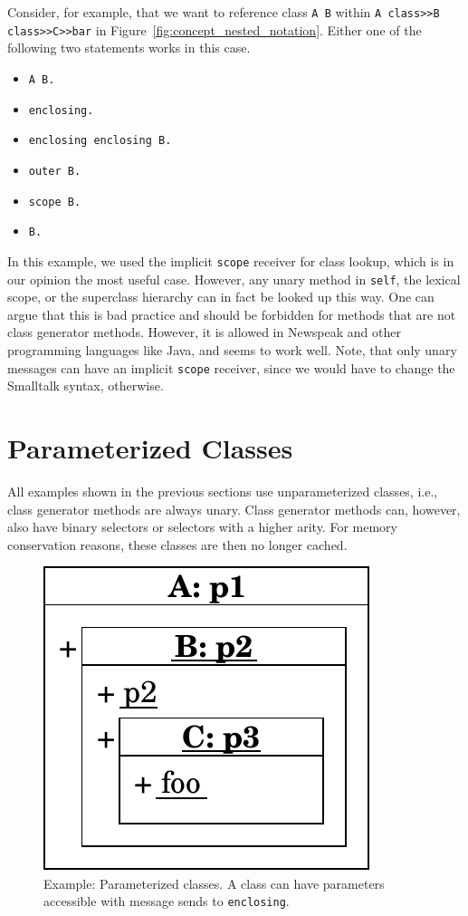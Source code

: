 Consider, for example, that we want to reference class \texttt{A B} within \texttt{A class>>B class>>C>>bar} in Figure~\ref{fig:concept_nested_notation}. Either one of the following two statements works in this case.

\begin{itemize}
	\item \texttt{A B.}
	\item \texttt{enclosing.}
	\item \texttt{enclosing enclosing B.}
	\item \texttt{outer B.}
	\item \texttt{scope B.}
	\item \texttt{B.}
\end{itemize}

In this example, we used the implicit \texttt{scope} receiver for class lookup, which is in our opinion the most useful case. However, any unary method in \texttt{self}, the lexical scope, or the superclass hierarchy can in fact be looked up this way. One can argue that this is bad practice and should be forbidden for methods that are not class generator methods. However, it is allowed in Newspeak and other programming languages like Java, and seems to work well. Note, that only unary messages can have an implicit \texttt{scope} receiver, since we would have to change the Smalltalk syntax, otherwise.

\section{Parameterized Classes}
All examples shown in the previous sections use unparameterized classes, i.e., class generator methods are always unary. Class generator methods can, however, also have binary selectors or selectors with a higher arity. For memory conservation reasons, these classes are then no longer cached.

\begin{figure}
	\includegraphics[scale=0.75]{nested_notation_params.pdf}
	\centering
	\caption[Example: Parameterized classes]{Example: Parameterized classes. A class can have parameters accessible with message sends	 to \texttt{enclosing}.}
	\label{fig:concept_param_classes}
\end{figure}


